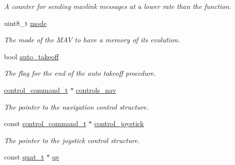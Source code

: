 \begin{DoxyCompactItemize}
\begin{DoxyCompactList}\small\item\em A counter for sending mavlink messages at a lower rate than the function. \end{DoxyCompactList}\item 
\hypertarget{structnavigation__t_a127176a10460015bb708806b2965d48d}{uint8\+\_\+t \hyperlink{structnavigation__t_a127176a10460015bb708806b2965d48d}{mode}}\label{structnavigation__t_a127176a10460015bb708806b2965d48d}

\begin{DoxyCompactList}\small\item\em The mode of the M\+A\+V to have a memory of its evolution. \end{DoxyCompactList}\item 
\hypertarget{structnavigation__t_a768966c48e223ad1ade308946e9cb73a}{bool \hyperlink{structnavigation__t_a768966c48e223ad1ade308946e9cb73a}{auto\+\_\+takeoff}}\label{structnavigation__t_a768966c48e223ad1ade308946e9cb73a}

\begin{DoxyCompactList}\small\item\em The flag for the end of the auto takeoff procedure. \end{DoxyCompactList}\item 
\hypertarget{structnavigation__t_a9da77b9ed9ca8c9487e4cc59e430ed0f}{\hyperlink{structcontrol__command__t}{control\+\_\+command\+\_\+t} $\ast$ \hyperlink{structnavigation__t_a9da77b9ed9ca8c9487e4cc59e430ed0f}{controls\+\_\+nav}}\label{structnavigation__t_a9da77b9ed9ca8c9487e4cc59e430ed0f}

\begin{DoxyCompactList}\small\item\em The pointer to the navigation control structure. \end{DoxyCompactList}\item 
\hypertarget{structnavigation__t_a6bad695864adfc2e98fb636dc0cf1554}{const \hyperlink{structcontrol__command__t}{control\+\_\+command\+\_\+t} $\ast$ \hyperlink{structnavigation__t_a6bad695864adfc2e98fb636dc0cf1554}{control\+\_\+joystick}}\label{structnavigation__t_a6bad695864adfc2e98fb636dc0cf1554}

\begin{DoxyCompactList}\small\item\em The pointer to the joystick control structure. \end{DoxyCompactList}\item 
\hypertarget{structnavigation__t_a07d1b4ed44aae9ff565610830651bcdf}{const \hyperlink{structquat__t}{quat\+\_\+t} $\ast$ \hyperlink{structnavigation__t_a07d1b4ed44aae9ff565610830651bcdf}{qe}}\label{structnavigation__t_a07d1b4ed44aae9ff565610830651bcdf}


\end{DoxyCompactItemize}
